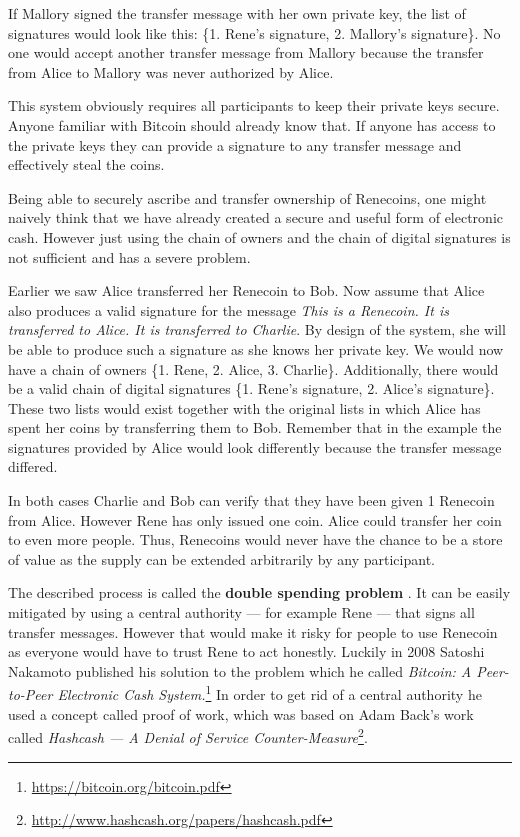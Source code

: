 \documentclass[a4paper,12pt,oneside,openany]{book}
\begin{document}
If Mallory signed the transfer message with her own private key, the list of signatures would look like this: \{1. Rene's signature, 2. Mallory's signature\}.
No one would accept another transfer message from Mallory because the transfer from Alice to Mallory was never authorized by Alice.

This system obviously requires all participants to keep their private keys secure.
Anyone familiar with Bitcoin should already know that.
If anyone has access to the private keys they can provide a signature to any transfer message and effectively steal the coins. 

Being able to securely ascribe and transfer ownership of Renecoins, one might naively think that we have already created a secure and useful form of electronic cash.
However just using the chain of owners and the chain of digital signatures is not sufficient and has a severe problem. 

Earlier we saw Alice transferred her Renecoin to Bob. Now assume that Alice also produces a valid signature for the message \textit{This is a Renecoin. It is transferred to Alice. It is transferred to Charlie}.
By design of the system, she will be able to produce such a signature as she knows her private key.
We would now have a chain of owners  \{1. Rene, 2. Alice, 3. Charlie\}.
Additionally, there would be a valid chain of digital signatures \{1. Rene's signature, 2. Alice's signature\}.
These two lists would exist together with the original lists in which Alice has spent her coins by transferring them to Bob.
Remember that in the example  the signatures provided by Alice would look differently because the transfer message differed.

In both cases Charlie and Bob can verify that they have been given 1 Renecoin from Alice.
However Rene has only issued one coin.
Alice could transfer her coin to even more people.
Thus, Renecoins would never have the chance to be a store of value as the supply can be extended arbitrarily by any participant.

The described process is called the \textbf{double spending problem} .
It can be easily mitigated by using a central authority --- for example Rene --- that signs all transfer messages.
However that would make it risky for people to use Renecoin as everyone would have to trust Rene to act honestly.
Luckily in 2008 Satoshi Nakamoto published his solution to the problem which he called \textit{Bitcoin: A Peer-to-Peer Electronic Cash System.}\footnote{\url{https://bitcoin.org/bitcoin.pdf}}
In order to get rid of a central authority he used a concept called proof of work, which was based on Adam Back's work called \textit{Hashcash --- A Denial of Service Counter-Measure}\footnote{\url{http://www.hashcash.org/papers/hashcash.pdf}}.
\end{document}
